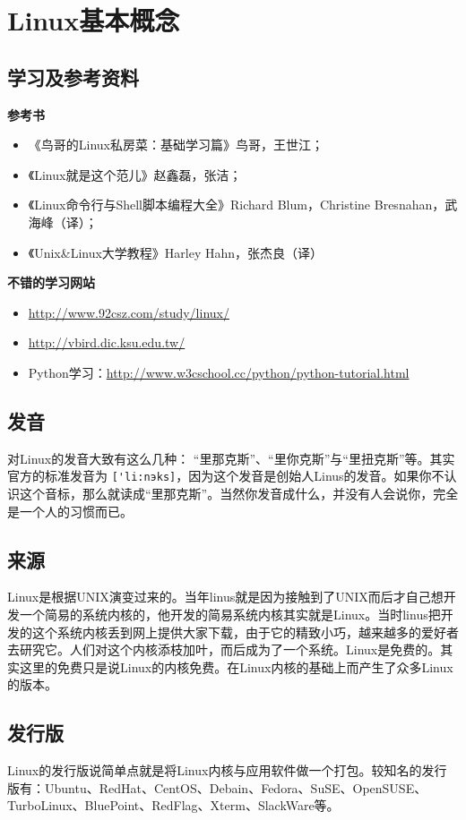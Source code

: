 \chapter{Linux基本概念}
\section{学习及参考资料}
\textbf{参考书}
\begin{itemize}
\item 《鸟哥的Linux私房菜：基础学习篇》鸟哥，王世江；
\item 《Linux就是这个范儿》赵鑫磊，张洁；
\item 《Linux命令行与Shell脚本编程大全》Richard Blum，Christine Bresnahan，武海峰（译）；
\item 《Unix\&Linux大学教程》Harley Hahn，张杰良（译）
\end{itemize}

\textbf{不错的学习网站}
\begin{itemize}
\item \url{http://www.92csz.com/study/linux/}

\item \url{http://vbird.dic.ksu.edu.tw/}

\item Python学习：\url{http://www.w3cschool.cc/python/python-tutorial.html}
\end{itemize}



\section{发音}
对Linux的发音大致有这么几种： “里那克斯”、“里你克斯”与“里扭克斯”等。其实官方的标准发音为 \verb|['li:nэks]|，因为这个发音是创始人Linus的发音。如果你不认识这个音标，那么就读成“里那克斯”。当然你发音成什么，并没有人会说你，完全是一个人的习惯而已。


\section{来源}
Linux是根据UNIX演变过来的。当年linus就是因为接触到了UNIX而后才自己想开发一个简易的系统内核的，他开发的简易系统内核其实就是Linux。当时linus把开发的这个系统内核丢到网上提供大家下载，由于它的精致小巧，越来越多的爱好者去研究它。人们对这个内核添枝加叶，而后成为了一个系统。Linux是免费的。其实这里的免费只是说Linux的内核免费。在Linux内核的基础上而产生了众多Linux的版本。


\section{发行版}
Linux的发行版说简单点就是将Linux内核与应用软件做一个打包。较知名的发行版有：Ubuntu、RedHat、CentOS、Debain、Fedora、SuSE、OpenSUSE、TurboLinux、BluePoint、RedFlag、Xterm、SlackWare等。


